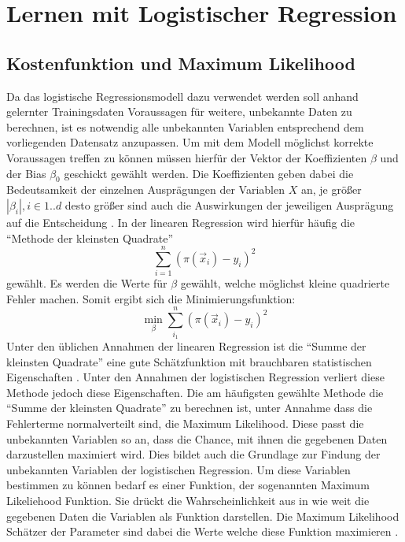 \section{Lernen mit Logistischer Regression}
\subsection{Kostenfunktion und Maximum Likelihood}
Da das logistische Regressionsmodell dazu verwendet werden soll anhand gelernter Trainingsdaten Voraussagen für weitere, unbekannte Daten zu berechnen, ist es notwendig alle unbekannten Variablen entsprechend dem vorliegenden Datensatz anzupassen.
Um mit dem Modell möglichst korrekte Voraussagen treffen zu können müssen hierfür der Vektor der Koeffizienten $\beta$ und der Bias $\beta_0$ geschickt gewählt werden. Die Koeffizienten geben dabei die Bedeutsamkeit der einzelnen Ausprägungen der Variablen $X$ an, je größer $|\beta_i|, i \in 1..d$ desto größer sind auch die Auswirkungen der jeweiligen Ausprägung auf die Entscheidung \cite{FS}.
In der linearen Regression wird hierfür häufig die "`Methode der kleinsten Quadrate"' 
\begin{displaymath}
\sum_{i=1}^n(\pi(\vec x_i)-y_i)^2
\end{displaymath}
gewählt. Es werden die Werte für $\beta$ gewählt, welche möglichst kleine quadrierte Fehler machen. Somit ergibt sich die Minimierungsfunktion: 
\begin{displaymath}
\min_\beta \sum_{i_1}^n (\pi(\vec x_i)-y_i)^2
\end{displaymath}
Unter den üblichen Annahmen der linearen Regression ist die "`Summe der kleinsten Quadrate"' eine gute Schätzfunktion mit brauchbaren statistischen Eigenschaften \cite{WIL}.
Unter den Annahmen der logistischen Regression verliert diese Methode jedoch diese Eigenschaften. Die am häufigsten gewählte Methode die "`Summe der kleinsten Quadrate"' zu berechnen ist, unter Annahme dass die Fehlerterme normalverteilt sind, die Maximum Likelihood. Diese passt die unbekannten Variablen so an, dass die Chance, mit ihnen die gegebenen Daten darzustellen maximiert wird. Dies bildet auch die Grundlage zur Findung der unbekannten Variablen der logistischen Regression. Um diese Variablen bestimmen zu können bedarf es einer Funktion, der sogenannten Maximum Likeliehood Funktion. Sie drückt die Wahrscheinlichkeit aus in wie weit die gegebenen Daten die Variablen als Funktion darstellen. Die Maximum Likelihood Schätzer der Parameter sind dabei die Werte welche diese Funktion maximieren \cite{WIL}.
